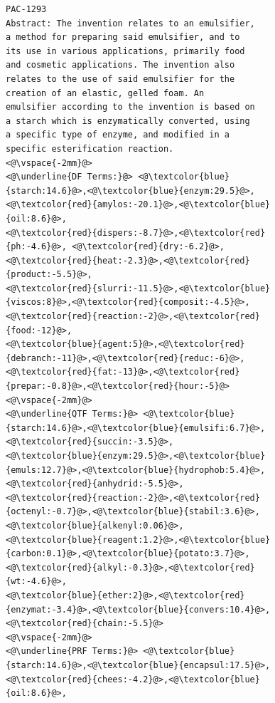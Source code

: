\begin{figure}[t!]
\begin{framed}
\vspace*{-3.5ex}
  \centering
 \begin{lstlisting}[basicstyle=\scriptsize\ttfamily , linewidth=\columnwidth,breaklines=true] 
PAC-1293
Abstract: The invention relates to an emulsifier, 
a method for preparing said emulsifier, and to 
its use in various applications, primarily food 
and cosmetic applications. The invention also 
relates to the use of said emulsifier for the 
creation of an elastic, gelled foam. An 
emulsifier according to the invention is based on 
a starch which is enzymatically converted, using 
a specific type of enzyme, and modified in a 
specific esterification reaction.
<@\vspace{-2mm}@>
<@\underline{DF Terms:}@> <@\textcolor{blue}{starch:14.6}@>,<@\textcolor{blue}{enzym:29.5}@>,<@\textcolor{red}{amylos:-20.1}@>,<@\textcolor{blue}{oil:8.6}@>,
<@\textcolor{red}{dispers:-8.7}@>,<@\textcolor{red}{ph:-4.6}@>, <@\textcolor{red}{dry:-6.2}@>,<@\textcolor{red}{heat:-2.3}@>,<@\textcolor{red}{product:-5.5}@>,
<@\textcolor{red}{slurri:-11.5}@>,<@\textcolor{blue}{viscos:8}@>,<@\textcolor{red}{composit:-4.5}@>,<@\textcolor{red}{reaction:-2}@>,<@\textcolor{red}{food:-12}@>,
<@\textcolor{blue}{agent:5}@>,<@\textcolor{red}{debranch:-11}@>,<@\textcolor{red}{reduc:-6}@>,<@\textcolor{red}{fat:-13}@>,<@\textcolor{red}{prepar:-0.8}@>,<@\textcolor{red}{hour:-5}@>
<@\vspace{-2mm}@>
<@\underline{QTF Terms:}@> <@\textcolor{blue}{starch:14.6}@>,<@\textcolor{blue}{emulsifi:6.7}@>,<@\textcolor{red}{succin:-3.5}@>,
<@\textcolor{blue}{enzym:29.5}@>,<@\textcolor{blue}{emuls:12.7}@>,<@\textcolor{blue}{hydrophob:5.4}@>,<@\textcolor{red}{anhydrid:-5.5}@>,
<@\textcolor{red}{reaction:-2}@>,<@\textcolor{red}{octenyl:-0.7}@>,<@\textcolor{blue}{stabil:3.6}@>,<@\textcolor{blue}{alkenyl:0.06}@>,
<@\textcolor{blue}{reagent:1.2}@>,<@\textcolor{blue}{carbon:0.1}@>,<@\textcolor{blue}{potato:3.7}@>,<@\textcolor{red}{alkyl:-0.3}@>,<@\textcolor{red}{wt:-4.6}@>,
<@\textcolor{blue}{ether:2}@>,<@\textcolor{red}{enzymat:-3.4}@>,<@\textcolor{blue}{convers:10.4}@>,<@\textcolor{red}{chain:-5.5}@>
<@\vspace{-2mm}@>
<@\underline{PRF Terms:}@> <@\textcolor{blue}{starch:14.6}@>,<@\textcolor{blue}{encapsul:17.5}@>,<@\textcolor{red}{chees:-4.2}@>,<@\textcolor{blue}{oil:8.6}@>,

\end{lstlisting}
\end{framed}
\end{figure}
